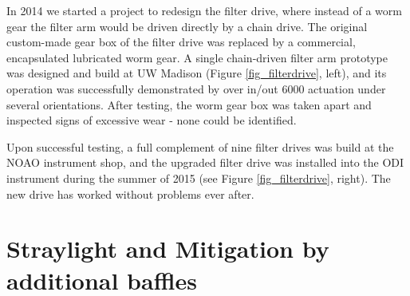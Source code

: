 \documentclass[]{spieman}
\begin{document}
In 2014 we  started a project to redesign the filter drive, where  
instead of a worm gear the filter arm would be driven directly by a chain 
drive. The original custom-made gear box of the filter drive was replaced by a commercial, 
encapsulated lubricated worm gear. A single chain-driven filter arm prototype was designed and build
at UW Madison (Figure \ref{fig_filterdrive}, left), and its operation was  successfully demonstrated 
by over in/out 6000 actuation under several orientations. After testing, the worm gear box
was taken apart and inspected signs of excessive wear - none  could be identified. 

Upon successful testing, a full complement of nine filter drives was build at 
the NOAO instrument shop, and the upgraded filter drive was installed into the 
ODI instrument during the summer of 2015 (see Figure \ref{fig_filterdrive}, 
right). The new drive has worked without problems ever after. 



\section{Straylight and Mitigation by additional baffles}
\end{document}
